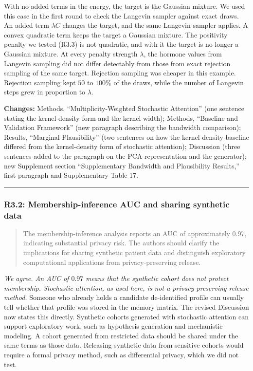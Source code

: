 \documentclass[
  11pt,
  letterpaper,
]{article}
\begin{document}
With no added terms in the energy, the target is the Gaussian mixture.
We used this case in the first round to check the Langevin sampler
against exact draws. An added term \(\lambda C\) changes the target, and
the same Langevin sampler applies. A convex quadratic term keeps the
target a Gaussian mixture. The positivity penalty we tested (R3.3) is
not quadratic, and with it the target is no longer a Gaussian mixture.
At every penalty strength \(\lambda\), the hormone values from Langevin
sampling did not differ detectably from those from exact rejection
sampling of the same target. Rejection sampling was cheaper in this
example. Rejection sampling kept \(50\) to \(100\%\) of the draws, while
the number of Langevin steps grew in proportion to \(\lambda\).

\textbf{Changes:} Methods, ``Multiplicity-Weighted Stochastic
Attention'' (one sentence stating the kernel-density form and the kernel
width); Methods, ``Baseline and Validation Framework'' (new paragraph
describing the bandwidth comparison); Results, ``Marginal Plausibility''
(two sentences on how the kernel-density baseline differed from the
kernel-density form of stochastic attention); Discussion (three
sentences added to the paragraph on the PCA representation and the
generator); new Supplement section ``Supplementary Bandwidth and
Plausibility Results,'' first paragraph and Supplementary Table 17.

\begin{center}\rule{0.5\linewidth}{0.5pt}\end{center}

\subsubsection{R3.2: Membership-inference AUC and sharing synthetic
data}\label{r3.2-membership-inference-auc-and-sharing-synthetic-data}

\begin{quote}
The membership-inference analysis reports an AUC of approximately 0.97,
indicating substantial privacy risk. The authors should clarify the
implications for sharing synthetic patient data and distinguish
exploratory computational applications from privacy-preserving release.
\end{quote}

\emph{We agree. An AUC of \(0.97\) means that the synthetic cohort does
not protect membership. Stochastic attention, as used here, is not a
privacy-preserving release method.} Someone who already holds a
candidate de-identified profile can usually tell whether that profile
was stored in the memory matrix. The revised Discussion now states this
directly. Synthetic cohorts generated with stochastic attention can
support exploratory work, such as hypothesis generation and mechanistic
modeling. A cohort generated from restricted data should be shared under
the same terms as those data. Releasing synthetic data from sensitive
cohorts would require a formal privacy method, such as differential
privacy, which we did not test.
\end{document}
